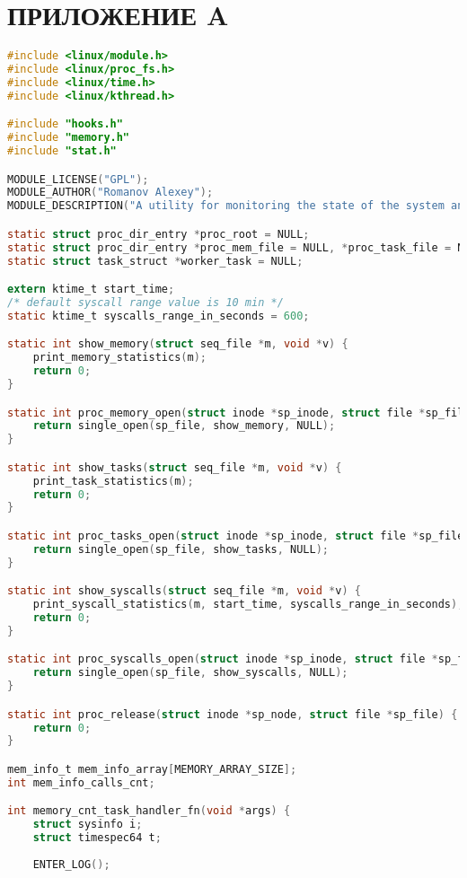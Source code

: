 \chapter*{ПРИЛОЖЕНИЕ A}

\begin{lstlisting}[label=lst:monitor_main, caption=Листинг файла monitor\_main.c, language=c]
#include <linux/module.h>
#include <linux/proc_fs.h> 
#include <linux/time.h>
#include <linux/kthread.h>

#include "hooks.h"
#include "memory.h"
#include "stat.h"

MODULE_LICENSE("GPL");
MODULE_AUTHOR("Romanov Alexey");
MODULE_DESCRIPTION("A utility for monitoring the state of the system and kernel load");

static struct proc_dir_entry *proc_root = NULL;
static struct proc_dir_entry *proc_mem_file = NULL, *proc_task_file = NULL, *proc_syscall_file = NULL;
static struct task_struct *worker_task = NULL;

extern ktime_t start_time;
/* default syscall range value is 10 min */
static ktime_t syscalls_range_in_seconds = 600;

static int show_memory(struct seq_file *m, void *v) {
	print_memory_statistics(m);
	return 0;
}

static int proc_memory_open(struct inode *sp_inode, struct file *sp_file) {
	return single_open(sp_file, show_memory, NULL);
}

static int show_tasks(struct seq_file *m, void *v) {
	print_task_statistics(m);
	return 0;
}

static int proc_tasks_open(struct inode *sp_inode, struct file *sp_file) {
	return single_open(sp_file, show_tasks, NULL);
}

static int show_syscalls(struct seq_file *m, void *v) {
	print_syscall_statistics(m, start_time, syscalls_range_in_seconds);
	return 0;
}

static int proc_syscalls_open(struct inode *sp_inode, struct file *sp_file) {
	return single_open(sp_file, show_syscalls, NULL);
}

static int proc_release(struct inode *sp_node, struct file *sp_file) {
	return 0;
}

mem_info_t mem_info_array[MEMORY_ARRAY_SIZE];
int mem_info_calls_cnt;

int memory_cnt_task_handler_fn(void *args) {
	struct sysinfo i;
	struct timespec64 t;
	
	ENTER_LOG();
	

\end{lstlisting}
